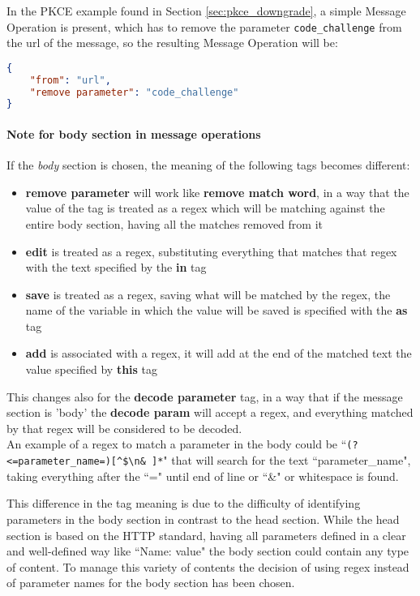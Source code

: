 In the \gls{PKCE} example found in Section \ref{sec:pkce_downgrade}, a simple Message Operation is present, which has to remove the parameter \texttt{code\_challenge} from the url of the message, so the resulting Message Operation will be:
\begin{lstlisting}[language=json, caption=Message Operation definition]
{
    "from": "url",
    "remove parameter": "code_challenge"
}
\end{lstlisting}

\paragraph{Note for body section in message operations}
If the \textit{body} section is chosen, the meaning of the following tags becomes different:
\begin{itemize}
    \item \textbf{remove parameter} will work like \textbf{remove match word}, in a way that the value of the tag is treated as a regex which will be matching against the entire body section, having all the matches removed from it
    \item \textbf{edit} is treated as a regex, substituting everything that matches that regex with the text specified by the \textbf{in} tag
    \item \textbf{save} is treated as a regex, saving what will be matched by the regex, the name of the variable in which the value will be saved is specified with the \textbf{as} tag
    \item \textbf{add} is associated with a regex, it will add at the end of the matched text the value specified by \textbf{this} tag
\end{itemize}

This changes also for the \textbf{decode parameter} tag, in a way that if the message section is 'body' the \textbf{decode param} will accept a regex, and everything matched by that regex will be considered to be decoded. \\ An example of a regex to match a parameter in the body could be ``\verb|(?<=parameter_name=)[^$\n& ]*|" that will search for the text ``parameter\_name", taking everything after the ``=" until end of line or ``\&" or whitespace is found.

This difference in the tag meaning is due to the difficulty of identifying parameters in the body section in contrast to the head section. While the head section is based on the HTTP standard, having all parameters defined in a clear and well-defined way like ``Name: value" the body section could contain any type of content. To manage this variety of contents the decision of using regex instead of parameter names for the body section has been chosen.

